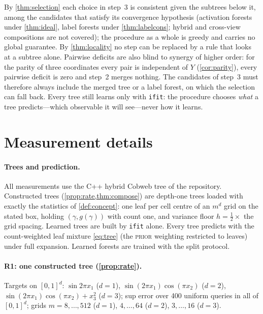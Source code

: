 \documentclass[11pt]{article}
\theoremstyle{definition}
\theoremstyle{remark}
\begin{document}
By \cref{thm:selection} each choice in step~3 is consistent given the subtrees below it,
among the candidates that satisfy its convergence hypothesis (activation forests under
\cref{thm:ideal}, label forests under \cref{thm:labelcons}; hybrid and cross-view
compositions are not covered);
the procedure as a whole is greedy and carries no global guarantee.  By
\cref{thm:locality} no step can be replaced by a rule that looks at a subtree alone.
Pairwise deficits are also blind to synergy of higher order: for the parity of three
coordinates every pair is independent of $Y$ (\cref{cor:parity}), every pairwise deficit
is zero and step~2 merges nothing.  The candidates of step~3 must therefore always
include the merged tree or a label forest, on which the selection can fall back.
Every tree still learns only with \texttt{ifit}: the procedure chooses \emph{what} a tree
predicts---which observable it will see---never how it learns.

\section{Measurement details}\label{app:measure}

\paragraph{Trees and prediction.}
All measurements use the C++ hybrid Cobweb tree of the repository.  Constructed trees
(\cref{prop:rate,thm:compose}) are depth-one trees loaded with exactly the statistics of
\cref{def:concept}: one leaf per cell centre of an $m^d$ grid on the stated box, holding
$(\gamma,g(\gamma))$ with count one, and variance floor $h=\tfrac12\times$ the grid spacing.
Learned trees are built by \texttt{ifit} alone.  Every tree predicts with the
count-weighted leaf mixture \eqref{eq:tree} (the \textsc{prior} weighting restricted to
leaves) under full expansion.  Learned forests are trained with the split protocol.

\paragraph{R1: one constructed tree (\cref{prop:rate}).}
Targets on $[0,1]^d$: $\sin2\pi x_1$ ($d=1$), $\sin(2\pi x_1)\cos(\pi x_2)$ ($d=2$),
$\sin(2\pi x_1)\cos(\pi x_2)+x_3^2$ ($d=3$); sup error over 400 uniform queries in all of
$[0,1]^d$; grids $m=8,\dots,512$ ($d=1$), $4,\dots,64$ ($d=2$), $3,\dots,16$ ($d=3$).
\end{document}
